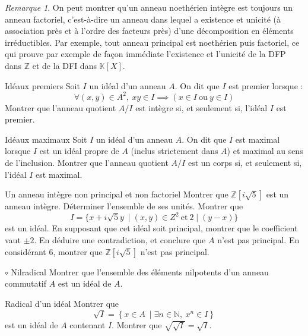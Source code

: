 \documentclass[french,a4paper]{article}
\newcommand{\N}{\mathbb{N}}
\newcommand{\Z}{\mathbb{Z}}
\newcommand{\K}{\mathbb{K}}
\theoremstyle{plain}
\theoremstyle{definition}
\theoremstyle{remark}
\newtheorem*{rmq}{Remarque}
\begin{document}
\begin{rmq}
	On peut montrer qu'un anneau noethérien intègre est toujours un anneau factoriel, c'est-à-dire un anneau dans lequel a existence et unicité (à association près et à l'ordre des facteurs près) d'une décomposition en éléments irréductibles. Par exemple, tout anneau principal est noethérien puis factoriel, ce qui prouve par exemple de façon immédiate l'existence et l'unicité de la DFP dans $\Z$ et de la DFI dans $\K[X]$.
\end{rmq}

\begin{ex}{Idéaux premiers}
	Soit $I$ un idéal d'un anneau $A$. On dit que $I$ est premier lorsque : $$\forall (x,y)\in A^2,\ xy\in I\implies (x\in I\ \text{ou}\ y\in I)$$ Montrer que l'anneau quotient $A/I$ est intègre si, et seulement si, l'idéal $I$ est premier.
\end{ex}

\begin{ex}[Morlot]{Idéaux maximaux}
	Soit $I$ un idéal d'un anneau $A$. On dit que $I$ est maximal lorsque $I$ est un idéal propre de $A$ (inclus strictement dans $A$) et maximal au sens de l'inclusion. Montrer que l'anneau quotient $A/I$ est un corps si, et seulement si, l'idéal $I$ est maximal.
\end{ex}

\begin{ex}[Morlot]{Un anneau intègre non principal et non factoriel}
	Montrer que $\Z[i\sqrt{5}]$ est un anneau intègre. Déterminer l'ensemble de ses unités. Montrer que $$I=\{x+i\sqrt{5}y\ \mid (x,y)\in Z^2\ \text{et}\ 2\mid (y-x)\}$$ est un idéal. En supposant que cet idéal soit principal, montrer que le coefficient vaut $\pm 2$. En déduire une contradiction, et conclure que $A$ n'est pas principal. En considérant $6$, montrer que $\Z[i\sqrt{5}]$ n'est pas principal.
\end{ex}

\begin{ex}[Moulin.33]{$\circ$ Nilradical}
	Montrer que l'ensemble des éléments nilpotents d'un anneau commutatif $A$ est un idéal de $A$.
\end{ex}

\begin{ex}[Moulin.32]{Radical d'un idéal}
	Montrer que $$\sqrt{I}=\left\{x\in A \ \mid \exists n\in\N,\ x^n\in I\right\}$$ est un idéal de $A$ contenant $I$. Montrer que $\displaystyle\sqrt{\sqrt{I}}=\sqrt{I}$.
\end{ex}
\end{document}
